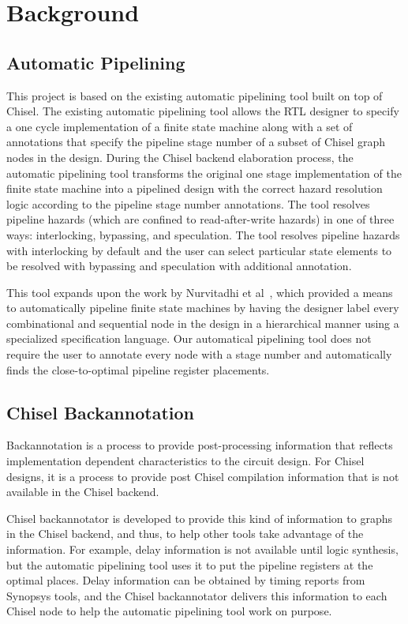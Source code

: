 \section{Background}
\subsection{Automatic Pipelining}
\label{sec:related-work}
This project is based on the existing automatic pipelining tool built on top of Chisel\cite{Bachrach:2012}. The existing automatic pipelining tool allows the RTL designer to specify a one cycle implementation of a finite state machine along with a set of annotations that specify the pipeline stage number of a subset of Chisel graph nodes in the design. During the Chisel backend elaboration process, the automatic pipelining tool transforms the original one stage implementation of the finite state machine into a pipelined design with the correct hazard resolution logic according to the pipeline stage number annotations. The tool resolves pipeline hazards (which are confined to read-after-write hazards) in one of three ways: interlocking, bypassing, and speculation. The tool resolves pipeline hazards with interlocking by default and the user can select particular state elements to be resolved with bypassing and speculation with additional annotation.

This tool expands upon the work by Nurvitadhi et al~\cite{hoe:syn}, which provided a means to automatically pipeline finite state machines by having the designer label every combinational and sequential node in the design in a hierarchical manner using a specialized specification language. Our automatical pipelining tool does not require the user to annotate every node with a stage number and automatically finds the close-to-optimal pipeline register placements.

\subsection{Chisel Backannotation}
Backannotation is a process to provide post-processing information that reflects implementation dependent characteristics to the circuit design. For Chisel designs, it is a process to provide post Chisel compilation information that is not available in the Chisel backend.

Chisel backannotator is developed to provide this kind of information to graphs in the Chisel backend, and thus, to help other tools take advantage of the information. For example, delay information is not available until logic synthesis, but the automatic pipelining tool uses it to put the pipeline registers at the optimal places. Delay information can be obtained by timing reports from Synopsys tools, and the Chisel backannotator delivers this information to each Chisel node to help the automatic pipelining tool work on purpose.

